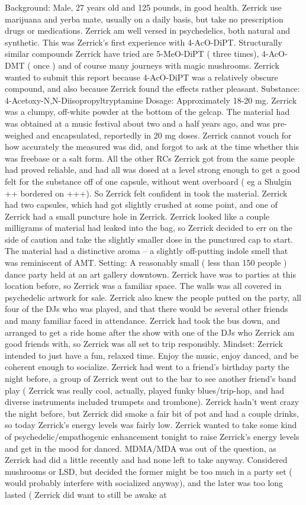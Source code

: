 \documentclass[12pt]{book}
\begin{document}
Background: Male, 27 years old and 125 pounds, in good health. Zerrick use marijuana and yerba mate, usually on a daily basis, but take no prescription drugs or medications. Zerrick am well versed in psychedelics, both natural and synthetic. This was Zerrick's first experience with 4-AcO-DiPT. Structurally similar compounds Zerrick have tried are 5-MeO-DiPT ( three times), 4-AcO-DMT ( once ) and of course many journeys with magic mushrooms. Zerrick wanted to submit this report because 4-AcO-DiPT was a relatively obscure compound, and also because Zerrick found the effects rather pleasant. Substance: 4-Acetoxy-N,N-Diisopropyltryptamine Dosage: Approximately 18-20 mg. Zerrick was a clumpy, off-white powder at the bottom of the gelcap. The material had was obtained at a music festival about two and a half years ago, and was pre-weighed and encapsulated, reportedly in 20 mg doses. Zerrick cannot vouch for how accurately the measured was did, and forgot to ask at the time whether this was freebase or a salt form. All the other RCs Zerrick got from the same people had proved reliable, and had all was dosed at a level strong enough to get a good felt for the substance off of one capsule, without went overboard ( eg a Shulgin ++ bordered on +++). So Zerrick felt confident in took the material. Zerrick had two capsules, which had got slightly crushed at some point, and one of Zerrick had a small puncture hole in Zerrick. Zerrick looked like a couple milligrams of material had leaked into the bag, so Zerrick decided to err on the side of caution and take the slightly smaller dose in the punctured cap to start. The material had a distinctive aroma -- a slightly off-putting indole smell that was reminiscent of AMT. Setting: A reasonably small ( less than 150 people ) dance party held at an art gallery downtown. Zerrick have was to parties at this location before, so Zerrick was a familiar space. The walls was all covered in psychedelic artwork for sale. Zerrick also knew the people putted on the party, all four of the DJs who was played, and that there would be several other friends and many familiar faced in attendance. Zerrick had took the bus down, and arranged to get a ride home after the show with one of the DJs who Zerrick am good friends with, so Zerrick was all set to trip responsibly. Mindset: Zerrick intended to just have a fun, relaxed time. Enjoy the music, enjoy danced, and be coherent enough to socialize. Zerrick had went to a friend's birthday party the night before, a group of Zerrick went out to the bar to see another friend's band play ( Zerrick was really cool, actually, played funky blues/trip-hop, and had diverse instruments included trumpets and trombone). Zerrick hadn't went crazy the night before, but Zerrick did smoke a fair bit of pot and had a couple drinks, so today Zerrick's energy levels was fairly low. Zerrick wanted to take some kind of psychedelic/empathogenic enhancement tonight to raise Zerrick's energy levels and get in the mood for danced. MDMA/MDA was out of the question, as Zerrick had did a little recently and had none left to take anyway. Considered mushrooms or LSD, but decided the former might be too much in a party set ( would probably interfere with socialized anyway), and the later was too long lasted ( Zerrick did want to still be awake at 
\end{document}
